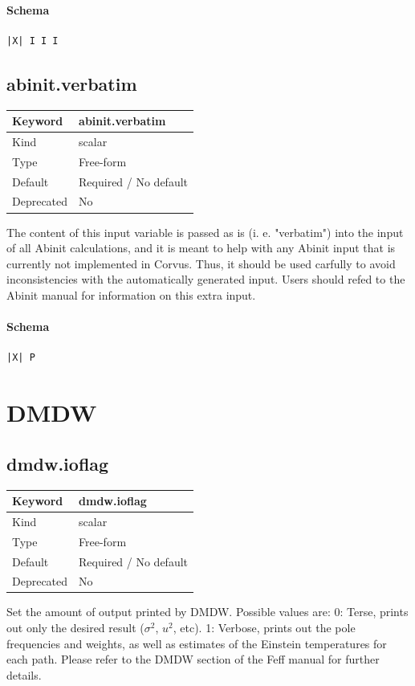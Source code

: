 \documentclass[11pt]{article}
\begin{document}
\paragraph{Schema}
\begin{Verbatim}
|X| I I I
\end{Verbatim}

\subsection{abinit.verbatim}
\label{kw:abinit-verbatim}
\begin{longtable}{|p{1.5in}|p{4.5in}|}
\hline
Keyword & abinit.verbatim \\
\hline
Kind & scalar \\
\hline
Type & Free-form \\
\hline
Default & Required / No default \\
\hline
Deprecated & No \\
\hline
\end{longtable}
 The content of this input variable is passed as is (i. e. "verbatim") into the
 input of all Abinit calculations, and it is meant to help with any Abinit
 input that is currently not implemented in Corvus. Thus, it should be used
 carfully to avoid inconsistencies with the automatically generated input.
 Users should refed to the Abinit manual for information on this extra input.

\paragraph{Schema}
\begin{Verbatim}
|X| P
\end{Verbatim}

\section{DMDW}

\subsection{dmdw.ioflag}
\label{kw:dmdw-ioflag}
\begin{longtable}{|p{1.5in}|p{4.5in}|}
\hline
Keyword & dmdw.ioflag \\
\hline
Kind & scalar \\
\hline
Type & Free-form \\
\hline
Default & Required / No default \\
\hline
Deprecated & No \\
\hline
\end{longtable}
 Set the amount of output printed by DMDW. Possible values are:
   0: Terse, prints out only the desired result ($\sigma^2$, $u^2$, etc).
   1: Verbose, prints out the pole frequencies and weights, as well as
      estimates of the Einstein temperatures for each path.
 Please refer to the DMDW section of the Feff manual for further details.
\end{document}
